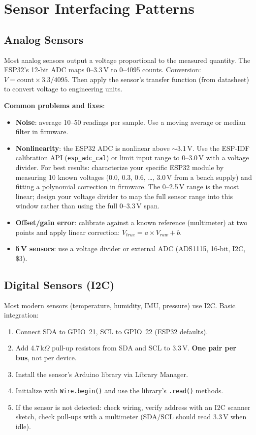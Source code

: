 \section{Sensor Interfacing Patterns}

\subsection{Analog Sensors}
Most analog sensors output a voltage proportional to the measured quantity. The ESP32's 12-bit ADC maps 0--3.3\,V to 0--4095 counts. Conversion: $V = \text{count} \times 3.3 / 4095$. Then apply the sensor's transfer function (from datasheet) to convert voltage to engineering units.

\textbf{Common problems and fixes}:
\begin{itemize}[nosep,leftmargin=1.5em]
\item \textbf{Noise}: average 10--50 readings per sample. Use a moving average or median filter in firmware.
\item \textbf{Nonlinearity}: the ESP32 ADC is nonlinear above $\sim$3.1\,V. Use the ESP-IDF calibration API (\texttt{esp\_adc\_cal}) or limit input range to 0--3.0\,V with a voltage divider. For best results: characterize your specific ESP32 module by measuring 10 known voltages (0.0, 0.3, 0.6, \ldots, 3.0\,V from a bench supply) and fitting a polynomial correction in firmware. The 0--2.5\,V range is the most linear; design your voltage divider to map the full sensor range into this window rather than using the full 0--3.3\,V span.
\item \textbf{Offset/gain error}: calibrate against a known reference (multimeter) at two points and apply linear correction: $V_{true} = a \times V_{raw} + b$.
\item \textbf{5\,V sensors}: use a voltage divider or external ADC (ADS1115, 16-bit, I2C, \$3).
\end{itemize}

\subsection{Digital Sensors (I2C)}
Most modern sensors (temperature, humidity, IMU, pressure) use I2C. Basic integration:
\begin{enumerate}[nosep,leftmargin=1.5em]
\item Connect SDA to GPIO~21, SCL to GPIO~22 (ESP32 defaults).
\item Add 4.7\,k$\Omega$ pull-up resistors from SDA and SCL to 3.3\,V. \textbf{One pair per bus}, not per device.
\item Install the sensor's Arduino library via Library Manager.
\item Initialize with \texttt{Wire.begin()} and use the library's \texttt{.read()} methods.
\item If the sensor is not detected: check wiring, verify address with an I2C scanner sketch, check pull-ups with a multimeter (SDA/SCL should read 3.3\,V when idle).
\end{enumerate}

